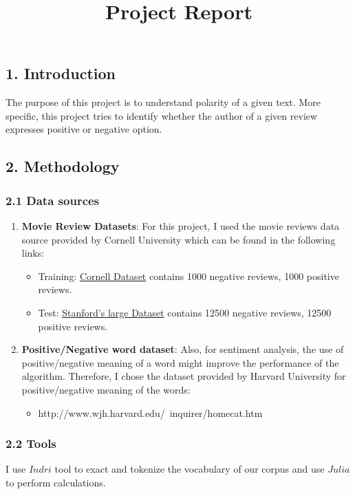 \documentclass[]{article}
\title{Project Report}
\begin{document}
\maketitle

\subsection{1. Introduction}\label{Introduction}
The purpose of this project is to understand polarity of a given text. More specific, this project tries to identify whether the author of a given review expresses
positive or negative option.
\subsection{2. Methodology}\label{Methodology}
\subsubsection{2.1 Data sources}
\begin{enumerate}
	\item \textbf{Movie Review Datasets}: 
	For this project, I used the movie reviews data source provided by Cornell University which can be found in the following links:
	\begin{itemize}
		\item Training: \href{https://www.cs.cornell.edu/people/pabo/movie-review-data/}{Cornell Dataset} contains 1000 negative reviews, 1000 positive reviews.
		\item Test:     \href{http://ai.stanford.edu/~amaas/data/sentiment/}{Stanford's large Dataset} contains 12500 negative reviews, 12500 positive reviews.
	\end{itemize} 
	\item \textbf{Positive/Negative word dataset}:
	Also, for sentiment analysis, the use of positive/negative meaning of a word might improve the performance of the algorithm. Therefore, I chose the dataset provided by Harvard University for positive/negative meaning of the words:
	\begin{itemize}
	 	\item http://www.wjh.harvard.edu/~inquirer/homecat.htm
	\end{itemize} 
\end{enumerate}
\subsubsection{2.2 Tools}
I use $Indri$ tool to exact and tokenize the vocabulary of our corpus and use $Julia$ to perform calculations. 
\end{document}
